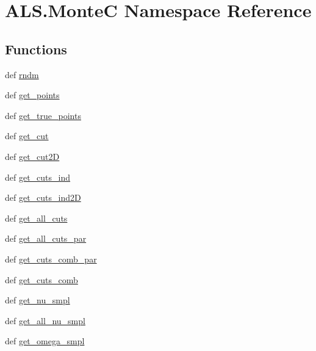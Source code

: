 \hypertarget{namespace_a_l_s_1_1_monte_c}{\section{A\+L\+S.\+Monte\+C Namespace Reference}
\label{namespace_a_l_s_1_1_monte_c}
}
\subsection*{Functions}
\begin{DoxyCompactItemize}
\item 
def \hyperlink{namespace_a_l_s_1_1_monte_c_af38508f703c31065cca06c8f411e2647}{rndm}
\item 
def \hyperlink{namespace_a_l_s_1_1_monte_c_ad5418939c96212a21f9e3b63306773a3}{get\+\_\+points}
\item 
def \hyperlink{namespace_a_l_s_1_1_monte_c_a3ffcade9d333b987a2a6a5c2aff021fa}{get\+\_\+true\+\_\+points}
\item 
def \hyperlink{namespace_a_l_s_1_1_monte_c_ac7c63eac0a651edb80bc40cf1ac69f5c}{get\+\_\+cut}
\item 
def \hyperlink{namespace_a_l_s_1_1_monte_c_aed6c2eed1b2a9517fc43f90108d43fd6}{get\+\_\+cut2\+D}
\item 
def \hyperlink{namespace_a_l_s_1_1_monte_c_aab81122b0c44d1d6b59570c4b32a0704}{get\+\_\+cuts\+\_\+ind}
\item 
def \hyperlink{namespace_a_l_s_1_1_monte_c_acfabb96f526bf87f1df769e7c32d932d}{get\+\_\+cuts\+\_\+ind2\+D}
\item 
def \hyperlink{namespace_a_l_s_1_1_monte_c_a764b15183b5b4cdfe0e63339822cd37c}{get\+\_\+all\+\_\+cuts}
\item 
def \hyperlink{namespace_a_l_s_1_1_monte_c_a4b3541bda919ddfe1a3f842e7864b0f8}{get\+\_\+all\+\_\+cuts\+\_\+par}
\item 
def \hyperlink{namespace_a_l_s_1_1_monte_c_ac9403f74afc2ad9e4518ab207a185dc3}{get\+\_\+cuts\+\_\+comb\+\_\+par}
\item 
def \hyperlink{namespace_a_l_s_1_1_monte_c_aaee151598865ef3d3847479893261782}{get\+\_\+cuts\+\_\+comb}
\item 
def \hyperlink{namespace_a_l_s_1_1_monte_c_af3153d7f58b8ce542fa113f78bec9495}{get\+\_\+nu\+\_\+smpl}
\item 
def \hyperlink{namespace_a_l_s_1_1_monte_c_a38097cbd2d99540a27cb869d78d8a6ee}{get\+\_\+all\+\_\+nu\+\_\+smpl}
\item 
def \hyperlink{namespace_a_l_s_1_1_monte_c_a91365e6b1de8336973a83bdbcee41cdb}{get\+\_\+omega\+\_\+smpl}

\end{DoxyCompactItemize}
